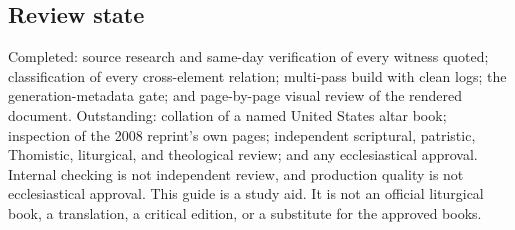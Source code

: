 \subsection*{Review state}

Completed: source research and same-day verification of every witness quoted;
classification of every cross-element relation; multi-pass build with clean
logs; the generation-metadata gate; and page-by-page visual review of the
rendered document. Outstanding: collation of a named United States altar book;
inspection of the 2008 reprint's own pages; independent scriptural, patristic,
Thomistic, liturgical, and theological review; and any ecclesiastical
approval. Internal checking is not independent review, and production quality
is not ecclesiastical approval. This guide is a study aid. It is not an
official liturgical book, a translation, a critical edition, or a substitute
for the approved books.
